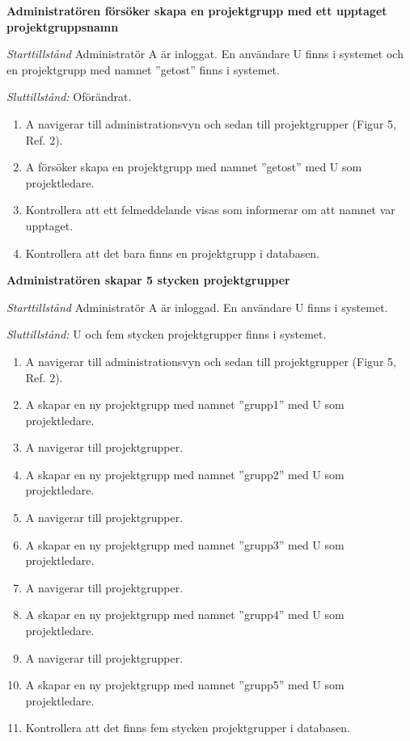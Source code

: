 \documentclass[a4paper]{article}
\begin{document}
\begin{FT}
\item
\textbf{Administratören försöker skapa en projektgrupp med ett upptaget projektgruppsnamn}

\emph{Starttillstånd} Administratör A är inloggat. En användare U finns i systemet och en projektgrupp med namnet ''getost'' finns i systemet.

\emph{Sluttillstånd:} Oförändrat.

\begin{enumerate}
\item A navigerar till administrationsvyn och sedan till projektgrupper (Figur 5, Ref. 2).
\item A försöker skapa en projektgrupp med namnet ''getost'' med U som projektledare.
\item Kontrollera att ett felmeddelande visas som informerar om att namnet var upptaget.
\item Kontrollera att det bara finns en projektgrupp i databasen.
\end{enumerate}

\item
\textbf{Administratören skapar 5 stycken projektgrupper}

\emph{Starttillstånd} Administratör A är inloggad. En användare U finns i systemet. 

\emph{Sluttillstånd:} U och fem stycken projektgrupper finns i systemet.

\begin{enumerate}
\item A navigerar till administrationsvyn och sedan till projektgrupper (Figur 5, Ref. 2).
\item A skapar en ny projektgrupp med namnet ''grupp1'' med U som projektledare.
\item A navigerar till projektgrupper.
\item A skapar en ny projektgrupp med namnet ''grupp2'' med U som projektledare.
\item A navigerar till projektgrupper.
\item A skapar en ny projektgrupp med namnet ''grupp3'' med U som projektledare.
\item A navigerar till projektgrupper.
\item A skapar en ny projektgrupp med namnet ''grupp4'' med U som projektledare.
\item A navigerar till projektgrupper.
\item A skapar en ny projektgrupp med namnet ''grupp5'' med U som projektledare.
\item Kontrollera att det finns fem stycken projektgrupper i databasen.
\end{enumerate}


\end{FT}
\end{document}
